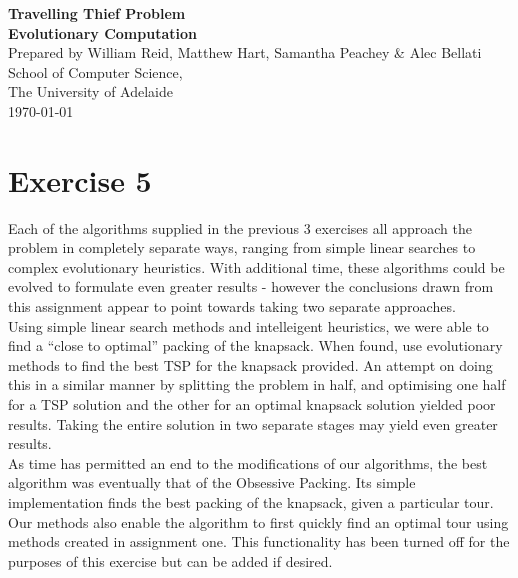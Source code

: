 \documentclass[a4paper,12pt]{article}
\begin{document}
\begin{center}
{\LARGE\bf Travelling Thief Problem}\\
\vspace{0.5cm}
{\Large\bf Evolutionary Computation}\\
\vspace{1cm}
Prepared by William Reid, Matthew Hart, Samantha Peachey \& Alec Bellati\\
\vspace{1cm}
School of Computer Science,\\
The University of Adelaide\\
\vspace{1cm}
\today
\end{center}

\vspace{1cm}
\section*{Exercise 5}
Each of the algorithms supplied in the previous 3 exercises all approach the problem in completely separate ways, ranging from simple linear searches to complex evolutionary heuristics. With additional time, these algorithms could be evolved to formulate even greater results - however the conclusions drawn from this assignment appear to point towards taking two separate approaches.\\

Using simple linear search methods and intelleigent heuristics,  we were able to find a ``close to optimal'' packing of the knapsack. When found, use evolutionary methods to find the best TSP for the knapsack provided. An attempt on doing this in a similar manner by splitting the problem in half, and optimising one half for a TSP solution and the other for an optimal knapsack solution yielded poor results. Taking the entire solution in two separate stages may yield even greater results.\\

As time has permitted an end to the modifications of our algorithms, the best algorithm was eventually that of the Obsessive Packing. Its simple implementation finds the best packing of the knapsack, given a particular tour. Our methods also enable the algorithm to first quickly find an optimal tour using methods created in assignment one. This functionality has been turned off for the purposes of this exercise but can be added if desired. 

\newpage
\end{document}
